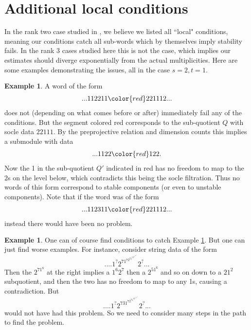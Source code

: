 \documentclass{amsart}
\numberwithin{equation}{section}
\numberwithin{figure}{section}
\numberwithin{table}{section}
\theoremstyle{definition}
\newtheorem{Example}[equation]{Example}
\begin{document}
\section{Additional local conditions}
In the rank two case studied in \cite{T21}, we believe we listed all ``local" conditions, meaning our conditions catch all sub-words which by themselves imply stability fails. In the rank 3 cases studied here this is not the case, which implies our estimates should diverge exponentially from the actual multiplicities. Here are some examples demonstrating the issues, all in the case $s=2,t=1$.  



\begin{Example} \label{ex:bad1}
	A word of the form
	$$ ...112211{\color{red}22111}2...$$
	does not (depending on what comes before or after) immediately fail any of the conditions. But the segment colored red corresponds to the sub-quotient $Q$ with socle data $22111$. By the preprojective relation and dimension counts this implies a submodule with data 
	$$...1122{\color{red} 122}.$$
	Now the 1 in the sub-quotient $Q'$ indicated in red has no freedom to map to the $2$s on the level below, which contradicts this being the socle filtration. Thus no words of this form correspond to stable components (or even to unstable components). 
	Note that if the word was of the form 
	$$ ...112311{\color{red} 22111}2...$$
	instead there would have been no problem. 
\end{Example}


\begin{Example} \label{ex:bad2}
	One can of course find conditions to catch Example \ref{ex:bad1}. But one can just find worse examples. For instance, consider string data of the form
	$$.... 1^?2^71^72^71^72^71^72^71^8 2^?...$$
	Then the $2^71^8$ at the right implies a $1^6 2^7$ then a   $2^51^6$  and so on down to a $21^2$ subquotient, and then the two has no freedom to map to any 1s, causing a contradiction. 
	But
	$$.... 1^?2^731^72^71^72^71^72^71^8 2^?...$$
	would not have had this problem. So we need to consider many steps in the path to find the problem. 
\end{Example}

\end{document}
